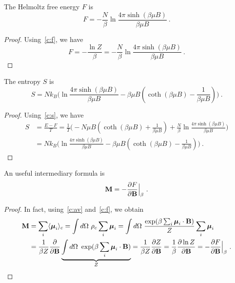     The Helmoltz free energy $F$ is 
    \begin{equation*}
        F = - \frac{N}{\beta} \ln \frac{4 \pi \sinh (\beta \mu B)}{\beta \mu B} ~.
    \end{equation*}
    \begin{proof}
        Using~\eqref{c:f}, we have
        \begin{equation*}
            F = - \frac{\ln Z}{\beta} = - \frac{N}{\beta} \ln \frac{4 \pi \sinh (\beta \mu B)}{\beta \mu B} ~.
        \end{equation*}
    \end{proof}
    
    The entropy $S$ is 
    \begin{equation*}
        S = N k_B \Big ( \ln \frac{4 \pi \sinh (\beta \mu B)}{\beta \mu B}  - \beta \mu B (\coth (\beta \mu B) - \frac{1}{\beta \mu B} ) \Big ) ~.
    \end{equation*}
    \begin{proof}
        Using~\eqref{c:s}, we have
        \begin{equation*}
        \begin{aligned}
            S & = \frac{E - F}{T} = \frac{1}{T} \Big (- N \mu B (\coth (\beta \mu B) + \frac{1}{\beta \mu B} ) + \frac{N}{\beta} \ln \frac{4 \pi \sinh (\beta \mu B)}{\beta \mu B}  \Big ) \\ & = N k_B \Big ( \ln \frac{4 \pi \sinh (\beta \mu B)}{\beta \mu B}  - \beta \mu B (\coth (\beta \mu B) - \frac{1}{\beta \mu B} ) \Big )~. 
        \end{aligned}
        \end{equation*}
    \end{proof}

    An useful intermediary formula is 
    \begin{equation*}
        \mathbf M = - \frac{\partial F}{\partial\mathbf B} \Big \vert_{\beta} ~.
    \end{equation*}
    \begin{proof}
        In fact, using~\eqref{c:av} and~\eqref{c:f}, we obtain 
        \begin{equation*}
        \begin{aligned}
            \mathbf M & = \sum_i \langle\boldsymbol \mu_i\rangle_c = \int d\Omega ~ \rho_c \sum_i \boldsymbol \mu_i  = \int d\Omega ~ \frac{\exp(\beta \sum_i \boldsymbol \mu_i \cdot \mathbf B)}{Z} \sum_i \boldsymbol \mu_i \\ & = \frac{1}{\beta Z} \frac{\partial}{\partial\mathbf B} \underbrace{\int d\Omega ~ \exp(\beta \sum_i \boldsymbol \mu_i \cdot \mathbf B)}_Z = \frac{1}{\beta Z} \frac{\partial Z}{\partial\mathbf B} = \frac{1}{\beta} \frac{\partial\ln Z}{\partial\mathbf B} = - \frac{\partial F}{\partial\mathbf B} \Big \vert_{\beta} ~.
        \end{aligned}
        \end{equation*}
    \end{proof}

